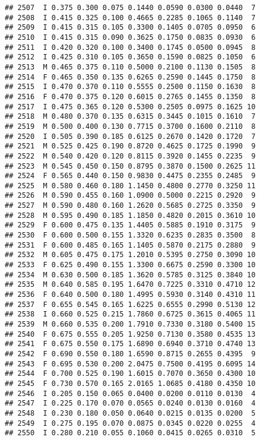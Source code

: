 \documentclass[
]{article}
\begin{document}
\begin{verbatim}
## 2507  I 0.375 0.300 0.075 0.1440 0.0590 0.0300 0.0440  7
## 2508  I 0.415 0.325 0.100 0.4665 0.2285 0.1065 0.1140  7
## 2509  I 0.415 0.315 0.105 0.3300 0.1405 0.0705 0.0950  6
## 2510  I 0.415 0.315 0.090 0.3625 0.1750 0.0835 0.0930  6
## 2511  I 0.420 0.320 0.100 0.3400 0.1745 0.0500 0.0945  8
## 2512  I 0.425 0.310 0.105 0.3650 0.1590 0.0825 0.1050  6
## 2513  M 0.465 0.375 0.110 0.5000 0.2100 0.1130 0.1505  8
## 2514  F 0.465 0.350 0.135 0.6265 0.2590 0.1445 0.1750  8
## 2515  I 0.470 0.370 0.110 0.5555 0.2500 0.1150 0.1630  8
## 2516  F 0.470 0.375 0.120 0.6015 0.2765 0.1455 0.1350  8
## 2517  I 0.475 0.365 0.120 0.5300 0.2505 0.0975 0.1625 10
## 2518  M 0.480 0.370 0.135 0.6315 0.3445 0.1015 0.1610  7
## 2519  M 0.500 0.400 0.130 0.7715 0.3700 0.1600 0.2110  8
## 2520  I 0.505 0.390 0.185 0.6125 0.2670 0.1420 0.1720  7
## 2521  M 0.525 0.425 0.190 0.8720 0.4625 0.1725 0.1990  9
## 2522  M 0.540 0.420 0.120 0.8115 0.3920 0.1455 0.2235  9
## 2523  M 0.545 0.450 0.150 0.8795 0.3870 0.1500 0.2625 11
## 2524  F 0.565 0.440 0.150 0.9830 0.4475 0.2355 0.2485  9
## 2525  M 0.580 0.460 0.180 1.1450 0.4800 0.2770 0.3250 11
## 2526  M 0.590 0.455 0.160 1.0900 0.5000 0.2215 0.2920  9
## 2527  M 0.590 0.480 0.160 1.2620 0.5685 0.2725 0.3350  9
## 2528  M 0.595 0.490 0.185 1.1850 0.4820 0.2015 0.3610 10
## 2529  F 0.600 0.475 0.135 1.4405 0.5885 0.1910 0.3175  9
## 2530  F 0.600 0.500 0.155 1.3320 0.6235 0.2835 0.3500  8
## 2531  F 0.600 0.485 0.165 1.1405 0.5870 0.2175 0.2880  9
## 2532  M 0.605 0.475 0.175 1.2010 0.5395 0.2750 0.3090 10
## 2533  F 0.625 0.490 0.155 1.3300 0.6675 0.2590 0.3300 10
## 2534  M 0.630 0.500 0.185 1.3620 0.5785 0.3125 0.3840 10
## 2535  M 0.640 0.585 0.195 1.6470 0.7225 0.3310 0.4710 12
## 2536  F 0.640 0.500 0.180 1.4995 0.5930 0.3140 0.4310 11
## 2537  F 0.655 0.545 0.165 1.6225 0.6555 0.2990 0.5130 12
## 2538  I 0.660 0.525 0.215 1.7860 0.6725 0.3615 0.4065 11
## 2539  M 0.660 0.535 0.200 1.7910 0.7330 0.3180 0.5400 15
## 2540  F 0.675 0.555 0.205 1.9250 0.7130 0.3580 0.4535 13
## 2541  F 0.675 0.550 0.175 1.6890 0.6940 0.3710 0.4740 13
## 2542  F 0.690 0.550 0.180 1.6590 0.8715 0.2655 0.4395  9
## 2543  F 0.695 0.530 0.200 2.0475 0.7500 0.4195 0.6095 14
## 2544  F 0.700 0.525 0.190 1.6015 0.7070 0.3650 0.4300 10
## 2545  F 0.730 0.570 0.165 2.0165 1.0685 0.4180 0.4350 10
## 2546  I 0.205 0.150 0.065 0.0400 0.0200 0.0110 0.0130  4
## 2547  I 0.225 0.170 0.070 0.0565 0.0240 0.0130 0.0160  4
## 2548  I 0.230 0.180 0.050 0.0640 0.0215 0.0135 0.0200  5
## 2549  I 0.275 0.195 0.070 0.0875 0.0345 0.0220 0.0255  4
## 2550  I 0.280 0.210 0.055 0.1060 0.0415 0.0265 0.0310  5

\end{verbatim}
\end{document}
